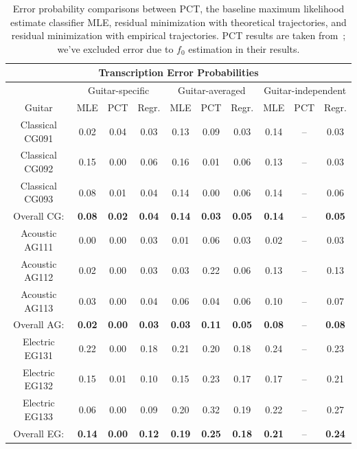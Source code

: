 \documentclass[12pt]{cmuthesis}
\begin{document}
\begin{table}[!htbp]
\begin{center}
\begin{tabular} {||c||c|c|c||c|c|c||c|c|c||}
\hline
\multicolumn{10}{||c||}{\bf{Transcription Error Probabilities}} \\
\hline
 & \multicolumn{3}{|c||}{Guitar-specific} & \multicolumn{3}{|c||}{Guitar-averaged}& \multicolumn{3}{|c||}{Guitar-independent}\\
\hline
Guitar & MLE & PCT & Regr. & MLE & PCT & Regr. & MLE & PCT & Regr.\\
\hline
\hline
Classical CG091 & 0.02 & 0.04 & 0.03 & 0.13 & 0.09 & 0.03 & 0.14 & -- & 0.03 \\
\hline
Classical CG092 & 0.15 & 0.00 & 0.06 & 0.16 & 0.01 & 0.06 & 0.13 & -- & 0.03 \\
\hline
Classical CG093 & 0.08 & 0.01 & 0.04 & 0.14 & 0.00 & 0.06 & 0.14 & -- & 0.06 \\
\hline
Overall CG: & \bf{0.08} & \bf{0.02}  & \bf{0.04} & \bf{0.14} & \bf{0.03} & \bf{0.05} & \bf{0.14} & -- & \bf{0.05}\\
\hline
\hline
Acoustic AG111 & 0.00 & 0.00 & 0.03 & 0.01 & 0.06 & 0.03 & 0.02 & -- & 0.03 \\
\hline
Acoustic AG112 & 0.02 & 0.00 & 0.03 & 0.03 & 0.22 & 0.06 & 0.13 & -- & 0.13 \\
\hline
Acoustic AG113  & 0.03 & 0.00 & 0.04 & 0.06 & 0.04 & 0.06 & 0.10 & -- & 0.07\\
\hline
Overall AG: & \bf{0.02} & \bf{0.00} & \bf{0.03} & \bf{0.03} & \bf{0.11} & \bf{0.05} & \bf{0.08} & -- & \bf{0.08}\\
\hline
\hline
Electric EG131 & 0.22 & 0.00 & 0.18 & 0.21 & 0.20 & 0.18 & 0.24 & -- & 0.23\\
\hline
Electric EG132 & 0.15 & 0.01 & 0.10 & 0.15 & 0.23 & 0.17 & 0.17 & -- & 0.21\\
\hline
Electric EG133 & 0.06 & 0.00 & 0.09 & 0.20 & 0.32  & 0.19 & 0.22 & -- & 0.27 \\
\hline
Overall EG: & \bf{0.14} & \bf{0.00} & \bf{0.12} & \bf{0.19} & \bf{0.25} & \bf{0.18} & \bf{0.21} & -- & \bf{0.24}\\
\hline
\end{tabular}
\caption{Error probability comparisons between PCT, the baseline maximum likelihood estimate classifier MLE, residual minimization with theoretical trajectories, and residual minimization with empirical trajectories. PCT results are taken from~\cite{barbanchoi2012}; we've excluded error due to $f_0$ estimation in their results.}
\label{tab:error-results-RWC}
\end{center}
\end{table}
\end{document}
